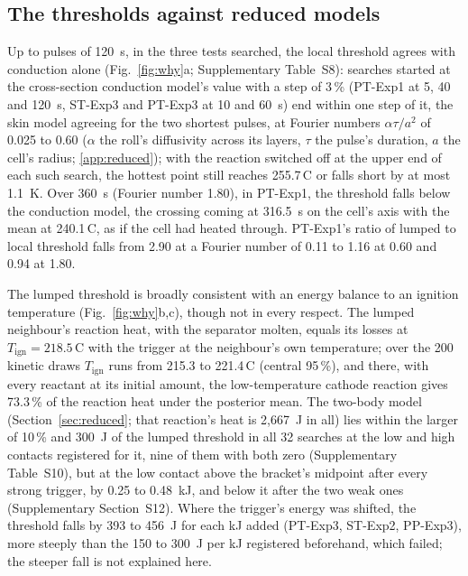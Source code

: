 \documentclass[preprint,12pt]{elsarticle}
\newcommand{\degC}{\,\textdegree C}
\begin{document}
\subsection{The thresholds against reduced models}
\label{sec:res-why}

Up to pulses of 120~s, in the three tests searched, the local threshold agrees with conduction alone (Fig.~\ref{fig:why}a; Supplementary Table~S8): searches started at the cross-section conduction model's value with a step of 3\,\% (PT-Exp1 at 5, 40 and 120~s, ST-Exp3 and PT-Exp3 at 10 and 60~s) end within one step of it, the skin model agreeing for the two shortest pulses, at Fourier numbers $\alpha\tau/a^2$ of 0.025 to 0.60 ($\alpha$ the roll's diffusivity across its layers, $\tau$ the pulse's duration, $a$ the cell's radius; \ref{app:reduced}); with the reaction switched off at the upper end of each such search, the hottest point still reaches 255.7\degC{} or falls short by at most 1.1~K. Over 360~s (Fourier number 1.80), in PT-Exp1, the threshold falls below the conduction model, the crossing coming at 316.5~s on the cell's axis with the mean at 240.1\degC, as if the cell had heated through. PT-Exp1's ratio of lumped to local threshold falls from 2.90 at a Fourier number of 0.11 to 1.16 at 0.60 and 0.94 at 1.80.

The lumped threshold is broadly consistent with an energy balance to an ignition temperature (Fig.~\ref{fig:why}b,c), though not in every respect. The lumped neighbour's reaction heat, with the separator molten, equals its losses at $T_\mathrm{ign}=218.5$\degC{} with the trigger at the neighbour's own temperature; over the 200 kinetic draws $T_\mathrm{ign}$ runs from 215.3 to 221.4\degC{} (central 95\,\%), and there, with every reactant at its initial amount, the low-temperature cathode reaction gives 73.3\,\% of the reaction heat under the posterior mean. The two-body model (Section~\ref{sec:reduced}; that reaction's heat is 2,667~J in all) lies within the larger of 10\,\% and 300~J of the lumped threshold in all 32 searches at the low and high contacts registered for it, nine of them with both zero (Supplementary Table~S10), but at the low contact above the bracket's midpoint after every strong trigger, by 0.25 to 0.48~kJ, and below it after the two weak ones (Supplementary Section~S12). Where the trigger's energy was shifted, the threshold falls by 393 to 456~J for each kJ added (PT-Exp3, ST-Exp2, PP-Exp3), more steeply than the 150 to 300~J per kJ registered beforehand, which failed; the steeper fall is not explained here.
\end{document}
